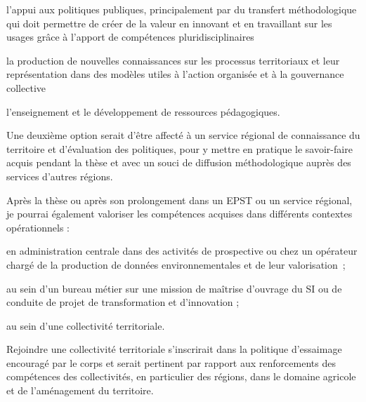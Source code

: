\item l'appui aux politiques publiques, principalement par du transfert
méthodologique qui doit permettre de créer de la valeur en innovant et en
travaillant sur les usages grâce à l'apport de compétences pluridisciplinaires

\item la production de nouvelles connaissances sur les processus territoriaux et
leur représentation dans des modèles utiles à l'action organisée et à la
gouvernance collective

\item l'enseignement et le développement de ressources pédagogiques.

\stopitemize

Une deuxième option serait d’être affecté à un service régional de
connaissance du territoire et d'évaluation des politiques, pour y mettre en
pratique le savoir-faire acquis pendant la thèse et avec un souci de diffusion
méthodologique auprès des services d’autres régions.

Après la thèse ou après son prolongement dans un EPST ou un service régional,
je pourrai également valoriser les compétences acquises dans différents
contextes opérationnels :

\startitemize

\item en administration centrale dans des activités de prospective ou chez un
opérateur chargé de la production de données environnementales et de leur
valorisation ;

\item au sein d'un bureau métier sur une mission de maîtrise d'ouvrage du SI ou de
conduite de projet de transformation et d’innovation ;

\item au sein d'une collectivité territoriale.

\stopitemize

Rejoindre une collectivité territoriale s'inscrirait dans la politique
d'essaimage encouragé par le corps et serait pertinent par rapport aux
renforcements des compétences des collectivités, en particulier des régions,
dans le domaine agricole et de l'aménagement du territoire.
